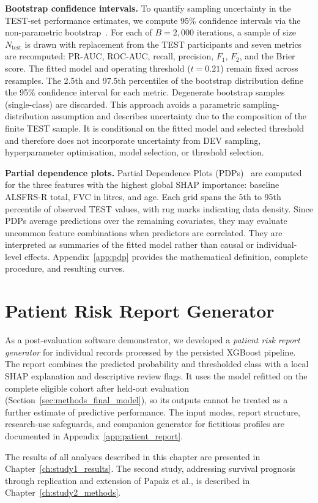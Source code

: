 \noindent\textbf{Bootstrap confidence intervals.}
To quantify sampling uncertainty in the \gls{TEST}-set performance estimates, we compute 95\% confidence intervals via the non-parametric bootstrap~\cite{efron1993bootstrap}.
For each of $B\!=\!2{,}000$ iterations, a sample of size $N_{\text{test}}$ is drawn with replacement from the \gls{TEST} participants and seven metrics are recomputed: \gls{PR-AUC}, \gls{ROC-AUC}, recall, precision, $F_1$, $F_2$, and the Brier score.
The fitted model and operating threshold ($t=0.21$) remain fixed across resamples.
The 2.5th and 97.5th percentiles of the bootstrap distribution define the 95\% confidence interval for each metric.
Degenerate bootstrap samples (single-class) are discarded.
This approach avoids a parametric sampling-distribution assumption and describes uncertainty due to the composition of the finite TEST sample.
It is conditional on the fitted model and selected threshold and therefore does not incorporate uncertainty from DEV sampling, hyperparameter optimisation, model selection, or threshold selection.

\noindent\textbf{Partial dependence plots.}
Partial Dependence Plots (PDPs)~\cite{friedman2001pdp} are computed for the three features with the highest global \gls{SHAP} importance: baseline \gls{ALSFRS-R} total, \gls{FVC} in litres, and age. Each grid spans the 5th to 95th percentile of observed \gls{TEST} values, with rug marks indicating data density. Since PDPs average predictions over the remaining covariates, they may evaluate uncommon feature combinations when predictors are correlated. They are interpreted as summaries of the fitted model rather than causal or individual-level effects. Appendix~\ref{app:pdp} provides the mathematical definition, complete procedure, and resulting curves.

\section{Patient Risk Report Generator}
\label{sec:methods_patient_report}

As a post-evaluation software demonstrator, we developed a \textit{patient risk report generator} for individual records processed by the persisted XGBoost pipeline. The report combines the predicted probability and thresholded class with a local \gls{SHAP} explanation and descriptive review flags. It uses the model refitted on the complete eligible cohort after held-out evaluation (Section~\ref{sec:methods_final_model}), so its outputs cannot be treated as a further estimate of predictive performance. The input modes, report structure, research-use safeguards, and companion generator for fictitious profiles are documented in Appendix~\ref{app:patient_report}.

\bigskip
\noindent
The results of all analyses described in this chapter are presented in Chapter~\ref{ch:study1_results}.
The second study, addressing survival prognosis through replication and extension of Papaiz et al., is described in Chapter~\ref{ch:study2_methods}.

